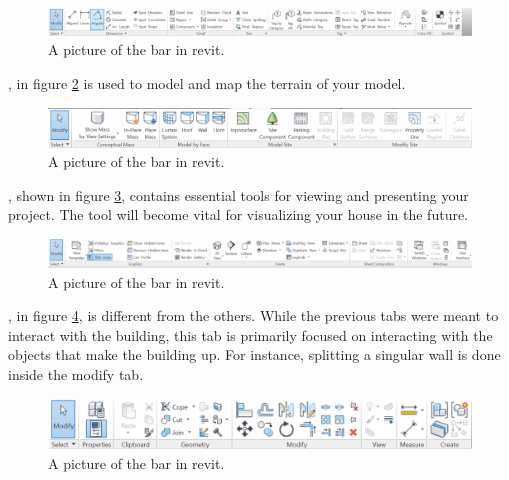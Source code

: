 \documentclass{tufte-book} %
\begin{document}
\begin{figure}
	\includegraphics[width=\linewidth]{revitannotationbar.png}
	\caption{A picture of the  bar in revit.}
	\label{fig:revanntab}
\end{figure}



, in figure \ref{fig:revmastab} is used to model and map the terrain of your model.

\begin{figure}
	\includegraphics[width=\linewidth]{revitmassingsitebar.png}
	\caption{A picture of the  bar in revit.}
	\label{fig:revmastab}
\end{figure}


, shown in figure \ref{fig:revviewtab}, contains essential tools for viewing and presenting your project. The \mbox{} tool will become vital for visualizing your house in the future.


\begin{figure}
	\includegraphics[width=\linewidth]{revitviewtab.png}
	\caption{A picture of the  bar in revit.}
	\label{fig:revviewtab}
\end{figure}

, in figure \ref{fig:revmodtab}, is different from the others. While the previous tabs were meant to interact with the building, this tab is primarily focused on interacting with the objects that make the building up. For instance, splitting a singular wall is done inside the modify tab.

\begin{figure}
	\includegraphics[width=\linewidth]{revitmodifytab.png}
	\caption{A picture of the  bar in revit.}
	\label{fig:revmodtab}
\end{figure}
\end{document}
